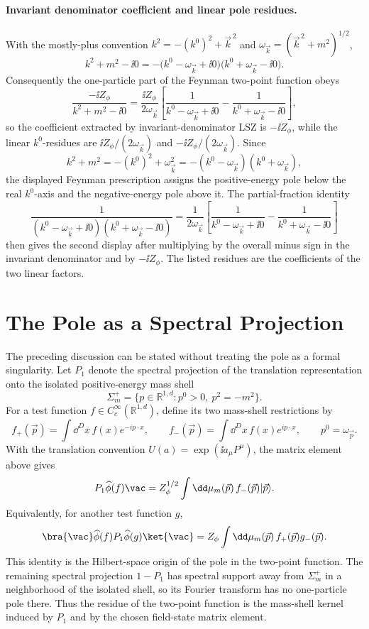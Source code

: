 \paragraph{Invariant denominator coefficient and linear pole residues.}
With the mostly-plus convention \(k^2=-(k^0)^2+\vec k^{\,2}\) and
\(\omega_{\vec k}=(\vec k^{\,2}+m^2)^{1/2}\),
\[
  k^2+m^2-\ii0
  =
  -\bigl(k^0-\omega_{\vec k}+\ii0\bigr)
   \bigl(k^0+\omega_{\vec k}-\ii0\bigr).
\]
Consequently the one-particle part of the Feynman two-point function obeys
\[
  \frac{-\ii Z_\phi}{k^2+m^2-\ii0}
  =
  \frac{\ii Z_\phi}{2\omega_{\vec k}}
  \left[
    \frac{1}{k^0-\omega_{\vec k}+\ii0}
    -
    \frac{1}{k^0+\omega_{\vec k}-\ii0}
  \right],
\]
so the coefficient extracted by invariant-denominator LSZ is
\(-\ii Z_\phi\), while the linear \(k^0\)-residues are
\(\ii Z_\phi/(2\omega_{\vec k})\) and
\(-\ii Z_\phi/(2\omega_{\vec k})\).
Since
\[
  k^2+m^2=-(k^0)^2+\omega_{\vec k}^2
  =-(k^0-\omega_{\vec k})(k^0+\omega_{\vec k}),
\]
the displayed Feynman prescription assigns the positive-energy pole below the
real \(k^0\)-axis and the negative-energy pole above it.  The partial-fraction
identity
\[
  \frac{1}{(k^0-\omega_{\vec k}+\ii0)(k^0+\omega_{\vec k}-\ii0)}
  =
  \frac{1}{2\omega_{\vec k}}
  \left[
    \frac{1}{k^0-\omega_{\vec k}+\ii0}
    -
    \frac{1}{k^0+\omega_{\vec k}-\ii0}
  \right]
\]
then gives the second display after multiplying by the overall minus sign in
the invariant denominator and by \(-\ii Z_\phi\).  The listed residues are the
coefficients of the two linear factors.

\section{The Pole as a Spectral Projection}

The preceding discussion can be stated without treating the pole as a formal
singularity. Let \(P_1\) denote the spectral projection of the translation
representation onto the isolated positive-energy mass shell
\[
  \Sigma_m^+
  =
  \{p\in\mathbb R^{1,d}:p^0>0,\ p^2=-m^2\}.
\]
For a test function \(f\in C_c^\infty(\mathbb R^{1,d})\), define its two
mass-shell restrictions by
\[
  f_+(\vec p)=\int \dd^{D}x\, f(x)e^{-ip\cdot x},
  \qquad
  f_-(\vec p)=\int \dd^{D}x\, f(x)e^{ip\cdot x},
  \qquad p^0=\omega_{\vec p}.
\]
With the translation convention \(U(a)=\exp(\ii a_\mu P^\mu)\), the matrix
element above gives
\[
  P_1\widehat\phi(f)\vac
  =
  Z_\phi^{1/2}\int \dd\mu_m(\vec p)\,
  f_-(\vec p)|\vec p\rangle.
\]
Equivalently, for another test function \(g\),
\[
  \bra{\vac}\widehat\phi(f)P_1\widehat\phi(g)\ket{\vac}
  =
  Z_\phi\int \dd\mu_m(\vec p)\,
  f_+(\vec p)g_-(\vec p).
\]
This identity is the Hilbert-space origin of the pole in the two-point
function. The remaining spectral projection \(1-P_1\) has spectral support
away from \(\Sigma_m^+\) in a neighborhood of the isolated shell, so its
Fourier transform has no one-particle pole there. Thus the residue of the
two-point function is the mass-shell kernel induced by \(P_1\) and by the
chosen field-state matrix element.

